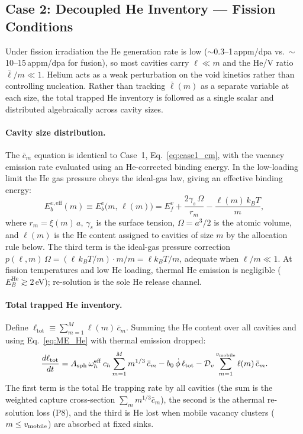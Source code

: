 \documentclass[pdflatex,sn-basic]{sn-jnl} %
\begin{document}
\subsection{Case 2: Decoupled He Inventory --- Fission Conditions}
\label{sec:case2}

Under fission irradiation the He generation rate is low
($\sim$0.3--1\,appm/dpa vs.\ $\sim$10--15\,appm/dpa for fusion), so
most cavities carry $\ell \ll m$ and the He/V ratio $\bar{\ell}/m \ll 1$.
Helium acts as a weak perturbation on the void kinetics rather than
controlling nucleation. Rather than tracking $\bar{\ell}(m)$ as a
separate variable at each size, the total trapped He inventory is
followed as a single scalar and distributed algebraically across cavity
sizes.

\paragraph{Cavity size distribution.}
The $\bar{c}_m$ equation is identical to Case~1,
Eq.~\eqref{eq:case1_cm}, with the vacancy emission rate evaluated using
an He-corrected binding energy. In the low-loading limit the He gas
pressure obeys the ideal-gas law, giving an effective binding energy:
\begin{equation}\label{eq:Ebv_eff}
    E_b^{v,\mathrm{eff}}(m)
    \equiv E_b^v\bigl(m,\,\ell(m)\bigr)
    = E_f^v + \frac{2\gamma_s\,\Omega}{r_m}
    - \frac{\ell(m)\,k_BT}{m},
\end{equation}
where $r_m = \xi(m)\,a$, $\gamma_s$ is the surface tension,
$\Omega = a^3/2$ is the atomic volume, and $\ell(m)$ is the He content
assigned to cavities of size $m$ by the allocation rule below. The
third term is the ideal-gas pressure correction $p(\ell,m)\,\Omega =
(\ell\,k_BT/m)\cdot m/m = \ell k_BT/m$, adequate when $\ell/m \ll 1$.
At fission temperatures and low He loading, thermal He emission is
negligible ($E_B^{\mathrm{He}} \gtrsim 2$\,eV); re-solution is the
sole He release channel.

\paragraph{Total trapped He inventory.}
Define $\ell_{\mathrm{tot}} \equiv \sum_{m=1}^M \ell(m)\,\bar{c}_m$.
Summing the He content over all cavities and using
Eq.~\eqref{eq:ME_He} with thermal emission dropped:
\begin{equation}\label{eq:case2_ltot}
    \frac{d\ell_{\mathrm{tot}}}{dt}
    = A_{\mathrm{sph}}\,\omega_h^{\mathrm{eff}}\,c_h
      \sum_{m=1}^{M} m^{1/3}\,\bar{c}_m
    - b_0\,\dot{\phi}\,\ell_{\mathrm{tot}}
    - \mathcal{D}_v \sum_{m=1}^{v_{\rm mobile}} \ell(m)\,\bar{c}_m.
\end{equation}
The first term is the total He trapping rate by all cavities (the sum
is the weighted capture cross-section $\sum_m m^{1/3}\bar{c}_m$),
the second is the athermal re-solution loss (P8), and
the third is He lost when mobile vacancy clusters
($m \leq v_{\rm mobile}$) are absorbed at fixed sinks.
\end{document}
